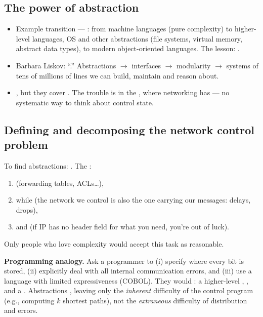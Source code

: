 \subsection{The power of abstraction}
\begin{itemize}
\item Example transition --- : from machine languages (pure complexity) to higher-level languages, OS and other abstractions (file systems, virtual memory, abstract data types), to modern object-oriented languages. The lesson: .
\item Barbara Liskov: ``.'' Abstractions $\to$ interfaces $\to$ modularity $\to$ systems of tens of millions of lines we can build, maintain and reason about.
\item {}, but they cover . The trouble is in the , where networking has  --- no systematic way to think about control state.
\end{itemize}

\subsection{Defining and decomposing the network control problem}
To find abstractions: .
The :
\begin{enumerate}
\item {} (forwarding tables, ACLs\ldots),
\item while  (the network we control is also the one carrying our messages: delays, drops),
\item and  (if IP has no header field for what you need, you're out of luck).
\end{enumerate}
Only people who love complexity would accept this task as reasonable.

\textbf{Programming analogy.} Ask a programmer to (i) specify where every bit is stored, (ii) explicitly deal with all internal communication errors, and (iii) use a language with limited expressiveness (COBOL). They would : a higher-level , , and a . Abstractions , leaving only the \emph{inherent} difficulty of the control program (e.g., computing $k$ shortest paths), not the \emph{extraneous} difficulty of distribution and errors.

